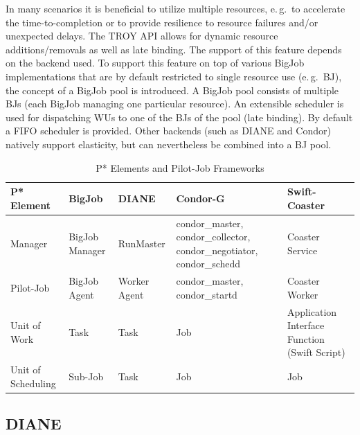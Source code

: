 \documentclass[conference,final]{IEEEtran}
\newcommand{\up}{\vspace*{-1em}}
\newcommand{\upp}{\vspace*{-0.5em}}
\begin{document}


In many scenarios it is beneficial to utilize multiple resources, e.\,g.\ to
accelerate the time-to-completion or to provide resilience to resource failures
and/or unexpected delays. The TROY API allows for dynamic resource
additions/removals as well as late binding. The support of this feature depends
on the backend used. To support this feature on top of various BigJob
implementations that are by default restricted to single resource use (e.\,g.\
BJ), the concept of a BigJob pool is introduced. A BigJob pool consists of
multiple BJs (each BigJob managing one particular resource). An extensible
scheduler is used for dispatching WUs to one of the BJs of the pool (late
binding). By default a FIFO scheduler is provided. Other backends (such as DIANE
and Condor) natively support elasticity, but can nevertheless be combined into a
BJ pool.

% 
\upp

\begin{table}[t]
\centering
\begin{tabular}{|p{2.5cm}|p{3cm}|p{3cm}|p{3cm}|p{3cm}|}
\hline
\textbf{P* Element} &\textbf{BigJob} &\textbf{DIANE} &\textbf{Condor-G} &\textbf{Swift-Coaster}  \\
\hline
Manager &BigJob Manager & RunMaster & condor\_master, condor\_collector, condor\_negotiator, condor\_schedd &Coaster Service\\ 
\hline
Pilot-Job &BigJob Agent  & Worker Agent &condor\_master, condor\_startd &Coaster Worker\\
\hline
Unit of Work &Task &Task &Job &Application Interface Function (Swift Script)\\
\hline
Unit of Scheduling &Sub-Job &Task &Job &Job\\
\hline
\end{tabular}
\caption{P* Elements and Pilot-Job Frameworks\up} \label{table:bigjob-saga-diane}
\end{table}

\upp
\subsection{DIANE\upp\upp}
\end{document}
